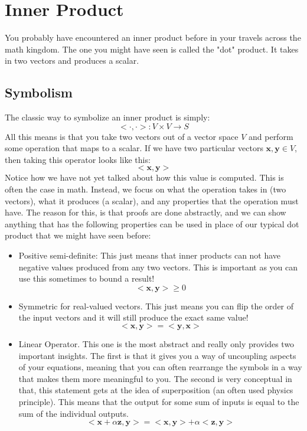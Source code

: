 \documentclass{article}
\newcommand{\vect}[1]{\bm{#1}} %
\begin{document}
\section{Inner Product}
You probably have encountered an inner product before in your travels across the math kingdom. The one you might have seen is called the "dot" product. It takes in two vectors and produces a scalar.

\subsection*{Symbolism}
The classic way to symbolize an inner product is simply:
\[
<\cdot, \cdot> : V \times V \rightarrow S
\]
All this means is that you take two vectors out of a vector space $V$ and perform some operation that maps to a scalar. If we have two particular vectors $\vect{x},\vect{y} \in V$, then taking this operator looks like this:
\[
<\vect{x},\vect{y}>
\]
Notice how we have not yet talked about how this value is computed. This is often the case in math. Instead, we focus on what the operation takes in (two vectors), what it produces (a scalar), and any properties that the operation must have. The reason for this, is that proofs are done abstractly, and we can show anything that has the following properties can be used in place of our typical dot product that we might have seen before:
\begin{itemize}
    \item Positive semi-definite: This just means that inner products can not have negative values produced from any two vectors. This is important as you can use this sometimes to bound a result!
    \[
    <\vect{x},\vect{y}> \geq 0
    \]
    \item Symmetric for real-valued vectors. This just means you can flip the order of the input vectors and it will still produce the exact same value!
    \[
    <\vect{x},\vect{y}> = <\vect{y},\vect{x}>
    \]
    \item Linear Operator. This one is the most abstract and really only provides two important insights. The first is that it gives you a way of uncoupling aspects of your equations, meaning that you can often rearrange the symbols in a way that makes them more meaningful to you. The second is very conceptual in that, this statement gets at the idea of superposition (an often used physics principle). This means that the output for some sum of inputs is equal to the sum of the individual outputs.
    \[
    <\vect{x}+\alpha \vect{z},\vect{y}> = <\vect{x},\vect{y}> + \alpha<\vect{z},\vect{y}>
    \]
\end{itemize}
\end{document}
